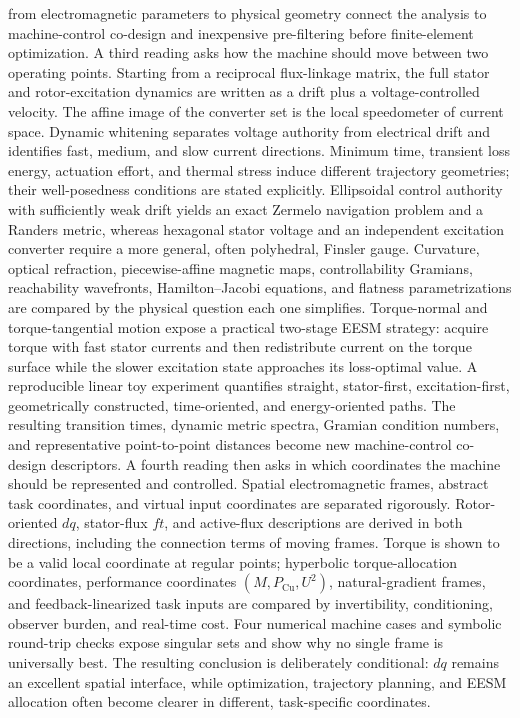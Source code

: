 {from electromagnetic parameters to physical geometry connect the analysis to
machine-control co-design and inexpensive pre-filtering before finite-element
optimization. A third reading asks how the machine should move between two
operating points. Starting from a reciprocal flux-linkage matrix, the full
stator and rotor-excitation dynamics are written as a drift plus a
voltage-controlled velocity. The affine image of the converter set is the
local speedometer of current space. Dynamic whitening separates voltage
authority from electrical drift and identifies fast, medium, and slow current
directions. Minimum time, transient loss energy, actuation effort, and thermal
stress induce different trajectory geometries; their well-posedness conditions
are stated explicitly. Ellipsoidal control authority with sufficiently weak
drift yields an exact Zermelo navigation problem and a Randers metric, whereas
hexagonal stator voltage and an independent excitation converter require a
more general, often polyhedral, Finsler gauge. Curvature, optical refraction,
piecewise-affine magnetic maps, controllability Gramians, reachability
wavefronts, Hamilton--Jacobi equations, and flatness parametrizations are
compared by the physical question each one simplifies. Torque-normal and
torque-tangential motion expose a practical two-stage EESM strategy: acquire
torque with fast stator currents and then redistribute current on the torque
surface while the slower excitation state approaches its loss-optimal value.
A reproducible linear toy experiment quantifies straight, stator-first,
excitation-first, geometrically constructed, time-oriented, and energy-oriented
paths. The resulting transition times, dynamic metric spectra, Gramian
condition numbers, and representative point-to-point distances become new
machine-control co-design descriptors. A fourth reading then asks in which
coordinates the machine should be represented and controlled. Spatial
electromagnetic frames, abstract task coordinates, and virtual input
coordinates are separated rigorously. Rotor-oriented $dq$, stator-flux
$ft$, and active-flux descriptions are derived in both directions, including
the connection terms of moving frames. Torque is shown to be a valid local
coordinate at regular points; hyperbolic torque-allocation coordinates,
performance coordinates $(M,P_{\mathrm{Cu}},U^2)$, natural-gradient frames,
and feedback-linearized task inputs are compared by invertibility,
conditioning, observer burden, and real-time cost. Four numerical machine
cases and symbolic round-trip checks expose singular sets and show why no
single frame is universally best. The resulting conclusion is deliberately
conditional: $dq$ remains an excellent spatial interface, while optimization,
trajectory planning, and EESM allocation often become clearer in different,
task-specific coordinates.}

\newif\ifshowglossary
\showglossarytrue
\newif\ifshowbibliography
\showbibliographytrue
